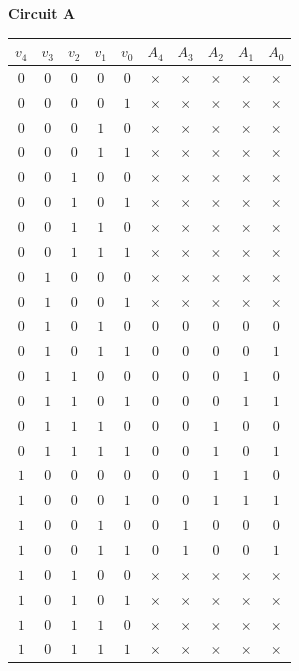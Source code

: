 \documentclass[13pt,a4paper]{report}
\begin{document}
\begin{minipage}[t]{0.6\textwidth}
{\bf \normalsize Circuit A}
\begin{table}[H]
\centering
\begin{tabular}{ccccc|ccccc}
$v_4$&$v_3$&$v_2$&$v_1$&$v_0$&$A_4$&$A_3$&$A_2$&$A_1$&$A_0$\\
\hline
$0$&$0$&$0$&$0$&$0$&$\times$&$\times$&$\times$&$\times$&$\times$\\
$0$&$0$&$0$&$0$&$1$&$\times$&$\times$&$\times$&$\times$&$\times$\\
$0$&$0$&$0$&$1$&$0$&$\times$&$\times$&$\times$&$\times$&$\times$\\
$0$&$0$&$0$&$1$&$1$&$\times$&$\times$&$\times$&$\times$&$\times$\\
$0$&$0$&$1$&$0$&$0$&$\times$&$\times$&$\times$&$\times$&$\times$\\
$0$&$0$&$1$&$0$&$1$&$\times$&$\times$&$\times$&$\times$&$\times$\\
$0$&$0$&$1$&$1$&$0$&$\times$&$\times$&$\times$&$\times$&$\times$\\
$0$&$0$&$1$&$1$&$1$&$\times$&$\times$&$\times$&$\times$&$\times$\\
$0$&$1$&$0$&$0$&$0$&$\times$&$\times$&$\times$&$\times$&$\times$\\
$0$&$1$&$0$&$0$&$1$&$\times$&$\times$&$\times$&$\times$&$\times$\\
$0$&$1$&$0$&$1$&$0$&$0$&$0$&$0$&$0$&$0$\\
$0$&$1$&$0$&$1$&$1$&$0$&$0$&$0$&$0$&$1$\\
$0$&$1$&$1$&$0$&$0$&$0$&$0$&$0$&$1$&$0$\\
$0$&$1$&$1$&$0$&$1$&$0$&$0$&$0$&$1$&$1$\\
$0$&$1$&$1$&$1$&$0$&$0$&$0$&$1$&$0$&$0$\\
$0$&$1$&$1$&$1$&$1$&$0$&$0$&$1$&$0$&$1$\\
$1$&$0$&$0$&$0$&$0$&$0$&$0$&$1$&$1$&$0$\\
$1$&$0$&$0$&$0$&$1$&$0$&$0$&$1$&$1$&$1$\\
$1$&$0$&$0$&$1$&$0$&$0$&$1$&$0$&$0$&$0$\\
$1$&$0$&$0$&$1$&$1$&$0$&$1$&$0$&$0$&$1$\\
$1$&$0$&$1$&$0$&$0$&$\times$&$\times$&$\times$&$\times$&$\times$\\
$1$&$0$&$1$&$0$&$1$&$\times$&$\times$&$\times$&$\times$&$\times$\\
$1$&$0$&$1$&$1$&$0$&$\times$&$\times$&$\times$&$\times$&$\times$\\
$1$&$0$&$1$&$1$&$1$&$\times$&$\times$&$\times$&$\times$&$\times$\\

\end{tabular}
\end{table}
\end{minipage}
\end{document}
